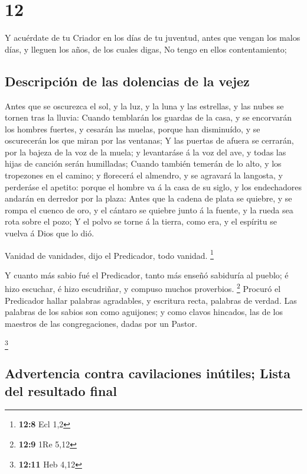 \hypertarget{section-11}{%
\section{12}\label{section-11}}

 Y acuérdate de tu Criador en los días de tu juventud,
antes que vengan los malos días, y lleguen los años, de los cuales
digas, No tengo en ellos contentamiento;

\hypertarget{descripciuxf3n-de-las-dolencias-de-la-vejez}{%
\subsection{Descripción de las dolencias de la
vejez}\label{descripciuxf3n-de-las-dolencias-de-la-vejez}}

 Antes que se oscurezca el sol, y la luz, y la luna y las
estrellas, y las nubes se tornen tras la lluvia:  Cuando
temblarán los guardas de la casa, y se encorvarán los hombres fuertes, y
cesarán las muelas, porque han disminuído, y se oscurecerán los que
miran por las ventanas;  Y las puertas de afuera se
cerrarán, por la bajeza de la voz de la muela; y levantaráse á la voz
del ave, y todas las hijas de canción serán humilladas; 
Cuando también temerán de lo alto, y los tropezones en el camino; y
florecerá el almendro, y se agravará la langosta, y perderáse el
apetito: porque el hombre va á la casa de su siglo, y los endechadores
andarán en derredor por la plaza:  Antes que la cadena de
plata se quiebre, y se rompa el cuenco de oro, y el cántaro se quiebre
junto á la fuente, y la rueda sea rota sobre el pozo;  Y
el polvo se torne á la tierra, como era, y el espíritu se vuelva á Dios
que lo dió.

 Vanidad de vanidades, dijo el Predicador, todo vanidad.
\footnote{\textbf{12:8} Ecl 1,2}

 Y cuanto más sabio fué el Predicador, tanto más enseñó
sabiduría al pueblo; é hizo escuchar, é hizo escudriñar, y compuso
muchos proverbios. \footnote{\textbf{12:9} 1Re 5,12} 
Procuró el Predicador hallar palabras agradables, y escritura recta,
palabras de verdad.  Las palabras de los sabios son como
aguijones; y como clavos hincados, las de los maestros de las
congregaciones, dadas por un Pastor.

\footnote{\textbf{12:11} Heb 4,12}

\hypertarget{advertencia-contra-cavilaciones-inuxfatiles-lista-del-resultado-final}{%
\subsection{Advertencia contra cavilaciones inútiles; Lista del
resultado
final}\label{advertencia-contra-cavilaciones-inuxfatiles-lista-del-resultado-final}}

